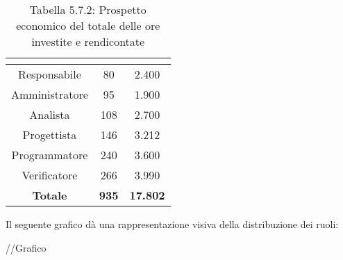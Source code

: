 \renewcommand{\arraystretch}{1.5}
\begin{table}[H]
\begin{center}
\begin{tabular}{|c|c|c|}
\hline
\rowcolor{title_row}
\textbf{\color{title_text}{Ruolo}}  & \textbf{\color{title_text}{Ore}} & \textbf{\color{title_text}{Costo in \euro}} \\ \hline
Responsabile    & 80 & 2.400 \\ \hline
Amministratore  & 95 & 1.900 \\ \hline
Analista        & 108 & 2.700 \\ \hline
Progettista     & 146 & 3.212 \\ \hline
Programmatore   & 240 & 3.600 \\ \hline
Verificatore    & 266 & 3.990 \\ \hline
\textbf{Totale} & \textbf{935}    & \textbf{17.802}           \\ \hline
\end{tabular}
\caption{Tabella 5.7.2: Prospetto economico del totale delle ore investite e rendicontate \label{}}
\end{center}
\end{table}
\renewcommand{\arraystretch}{1}

Il seguente grafico dà una rappresentazione visiva della distribuzione dei ruoli: \\
\begin{center}
//Grafico
\end{center}


\pagebreak